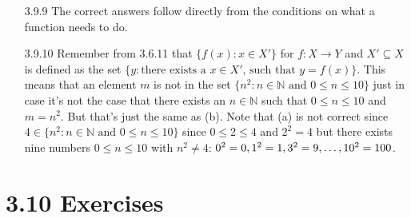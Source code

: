 \begin{enumerate}
		\item[3.9.9] The correct answers follow directly from the conditions on what a function needs to do.
		
		\item[3.9.10] Remember from 3.6.11 that $\{f(x):x\in X'\}$ for $f:X\to Y$ and $X'\subseteq X$ is defined as the set $\{y:\text{there exists a }x\in X'\text{, such that }y=f(x)\}$. This means that an element $m$ is not in the set $\{n^2:n\in\mathbb{N}\text{ and }0\leq n\leq 10\}$ just in case it's not the case that there exists an $n\in\mathbb{N}$ such that $0\leq n\leq 10$ and $m=n^2$. But that's just the same as (b). Note that (a) is not correct since $4\in \{n^2:n\in\mathbb{N}\text{ and }0\leq n\leq 10\}$ since $0\leq 2\leq 4$ and $2^2=4$ but there exists nine numbers $0\leq n\leq 10$ with $n^2\neq 4$: $0^2=0, 1^2=1, 3^2=9, \mathellipsis, 10^2=100$. 
	
	\end{enumerate}

\section*{3.10 Exercises}

